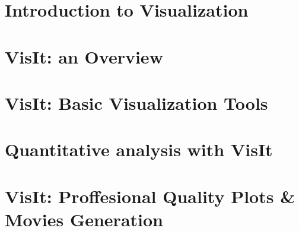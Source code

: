\documentclass[xcolor=svgnames]{beamer}
\providecommand{\sectionpage}{\Large\centering \bf\mediumblue\insertsection}
\begin{document}
\section{Introduction to Visualization}
\introEnv
\frame{\sectionpage}
  
\resetEnv

\section{VisIt: an Overview}
\basicEnv
\frame{\sectionpage}
 
\resetEnv

\section{VisIt: Basic Visualization Tools}
\basicEnv
\frame{\sectionpage}
 
 
\resetEnv

\section{Quantitative analysis with VisIt}
\normalEnv
\frame{\sectionpage}
 
\resetEnv

\section{VisIt: Proffesional Quality Plots \& Movies Generation}
\normEnv
\frame{\sectionpage}
 
 
\resetEnv

\end{document}
